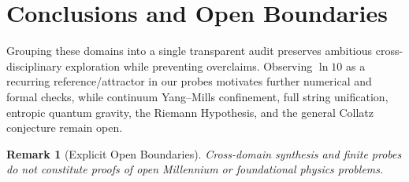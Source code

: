 \documentclass[11pt,a4paper]{article}
\newtheorem{remark}{Remark}
\begin{document}
\section{Conclusions and Open Boundaries}
Grouping these domains into a single transparent audit preserves ambitious cross-disciplinary exploration while preventing overclaims. Observing $\ln 10$ as a recurring reference/attractor in our probes motivates further numerical and formal checks, while continuum Yang--Mills confinement, full string unification, entropic quantum gravity, the Riemann Hypothesis, and the general Collatz conjecture remain open.

\begin{remark}[Explicit Open Boundaries]
Cross-domain synthesis and finite probes do not constitute proofs of open Millennium or foundational physics problems.
\end{remark}
\end{document}
